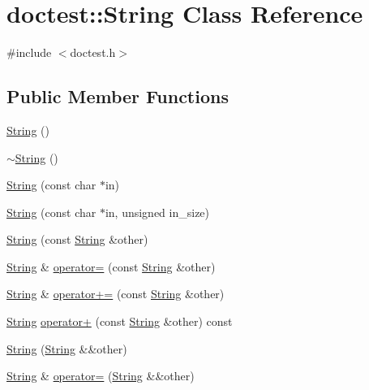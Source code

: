 \hypertarget{classdoctest_1_1_string}{}\section{doctest\+:\+:String Class Reference}
\label{classdoctest_1_1_string}


{\ttfamily \#include $<$doctest.\+h$>$}

\subsection*{Public Member Functions}
\begin{DoxyCompactItemize}
\item 
\mbox{\hyperlink{classdoctest_1_1_string_ab18d26f6c9e728c2fac77a501b8ca5f5}{String}} ()
\item 
\mbox{\hyperlink{classdoctest_1_1_string_af5dce5deeb8f25a4866efdff75e92975}{$\sim$\+String}} ()
\item 
\mbox{\hyperlink{classdoctest_1_1_string_abb4449cbc613cd973ae774c704fca5dd}{String}} (const char $\ast$in)
\item 
\mbox{\hyperlink{classdoctest_1_1_string_a01d9f84ab0a3dc67b195678b6073dd4c}{String}} (const char $\ast$in, unsigned in\+\_\+size)
\item 
\mbox{\hyperlink{classdoctest_1_1_string_a27ca7976da20bdebbf225fa496c38ad1}{String}} (const \mbox{\hyperlink{classdoctest_1_1_string}{String}} \&other)
\item 
\mbox{\hyperlink{classdoctest_1_1_string}{String}} \& \mbox{\hyperlink{classdoctest_1_1_string_a1979700c536cfe9b5fecc328245f74ca}{operator=}} (const \mbox{\hyperlink{classdoctest_1_1_string}{String}} \&other)
\item 
\mbox{\hyperlink{classdoctest_1_1_string}{String}} \& \mbox{\hyperlink{classdoctest_1_1_string_ad1df797f12cd140e3d1739f2b30b64d2}{operator+=}} (const \mbox{\hyperlink{classdoctest_1_1_string}{String}} \&other)
\item 
\mbox{\hyperlink{classdoctest_1_1_string}{String}} \mbox{\hyperlink{classdoctest_1_1_string_a6ddb6cf1b744a0ae1d4e26b3c8dfa827}{operator+}} (const \mbox{\hyperlink{classdoctest_1_1_string}{String}} \&other) const
\item 
\mbox{\hyperlink{classdoctest_1_1_string_a4bbdcb36cd68988953c3bb2d18e53210}{String}} (\mbox{\hyperlink{classdoctest_1_1_string}{String}} \&\&other)
\item 
\mbox{\hyperlink{classdoctest_1_1_string}{String}} \& \mbox{\hyperlink{classdoctest_1_1_string_a6099dbedeb150eb5659c7aa5dcea1727}{operator=}} (\mbox{\hyperlink{classdoctest_1_1_string}{String}} \&\&other)

\end{DoxyCompactItemize}

